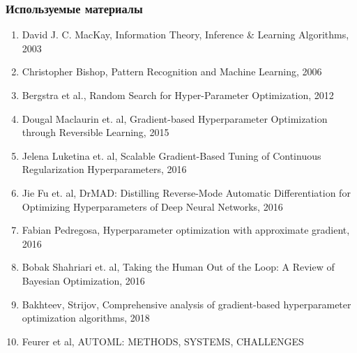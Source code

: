 \documentclass[10pt,pdf,utf8,russian,aspectratio=169]{beamer}
\begin{document}
\begin{frame}
\frametitle{Используемые материалы}
\begin{enumerate}
\item David J. C. MacKay, Information Theory, Inference \& Learning Algorithms, 2003
\item Christopher Bishop, Pattern Recognition and Machine Learning, 2006
\item Bergstra et al., Random Search for Hyper-Parameter Optimization, 2012
\item  Dougal Maclaurin et. al, Gradient-based Hyperparameter Optimization through Reversible Learning, 2015
\item Jelena Luketina et. al, Scalable Gradient-Based Tuning of
Continuous Regularization Hyperparameters, 2016
\item Jie Fu et. al, DrMAD: Distilling Reverse-Mode Automatic Differentiation for Optimizing
Hyperparameters of Deep Neural Networks, 2016
\item Fabian Pedregosa, Hyperparameter optimization with approximate gradient, 2016
\item Bobak Shahriari et. al,  Taking the Human Out of the Loop:
A Review of Bayesian Optimization, 2016
\item Bakhteev, Strijov, Comprehensive analysis of gradient-based hyperparameter optimization algorithms, 2018
\item Feurer et al, AUTOML: METHODS, SYSTEMS, CHALLENGES 
\end{enumerate}
\end{frame}
\end{document}

